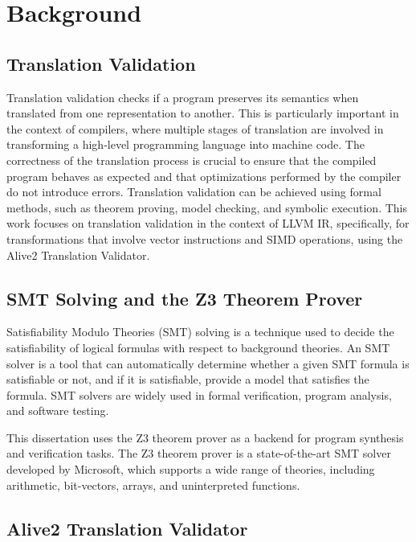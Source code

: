 \chapter{Background}
\label{chap:background}

\section {Translation Validation}

Translation validation checks if a program preserves its semantics
when translated from one representation to another.
%
This is particularly important in the context of compilers,
where multiple stages of translation are involved in transforming a
high-level programming language into machine code.
%
The correctness of the translation process is crucial to ensure that
the compiled program behaves as expected and that optimizations
performed by the compiler do not introduce errors.
%
Translation validation can be achieved using formal methods, such as
theorem proving, model checking, and symbolic execution.
%
This work focuses on translation validation in the context of
LLVM IR, specifically, for transformations that involve vector
instructions and SIMD operations, using the Alive2 Translation Validator.


\section {SMT Solving and the Z3 Theorem Prover}

Satisfiability Modulo Theories (SMT) solving is a technique used to
decide the satisfiability of logical formulas with respect to
background theories.
%
An SMT solver is a tool that can automatically determine whether a
given SMT formula is satisfiable or not, and if it is satisfiable,
provide a model that satisfies the formula.
%
SMT solvers are widely used in formal verification, program analysis,
and software testing.

This dissertation uses the Z3 theorem prover as a backend for program
synthesis and verification tasks.
%
The Z3 theorem prover is a state-of-the-art SMT solver developed by
Microsoft, which supports a wide range of theories, including
arithmetic, bit-vectors, arrays, and uninterpreted functions.
%

\section {Alive2 Translation Validator}


